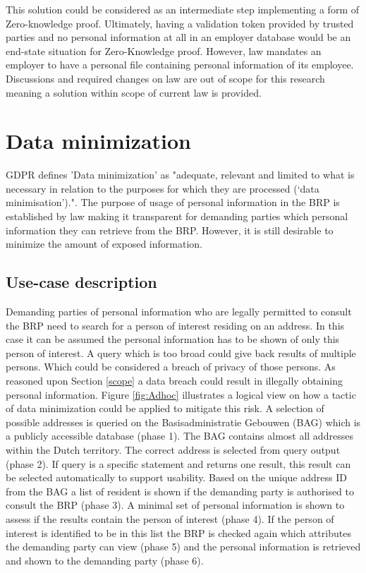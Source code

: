 This solution could be considered as an intermediate step implementing a form of Zero-knowledge proof. Ultimately, having a validation token provided by trusted parties and no personal information at all in an employer database would be an end-state situation for Zero-Knowledge proof. However, law mandates an employer to have a personal file containing personal information of its employee. Discussions and required changes on law are out of scope for this research meaning a solution within scope of current law is provided.
\clearpage

\section{Data minimization} \label{data-minimization}

GDPR \cite{GDPR} defines 'Data minimization' as "adequate, relevant and limited to what is necessary in relation to the purposes for which they are processed (‘data minimisation’).". The purpose of usage of personal information in the BRP is established by law making it transparent for demanding parties which personal information they can retrieve from the BRP. However, it is still desirable to minimize the amount of exposed information.

\subsection{Use-case description}
Demanding parties of personal information who are legally permitted to consult the BRP need to search for a person of interest residing on an address. In this case it can be assumed the personal information has to be shown of only this person of interest. A query which is too broad could give back results of multiple persons. Which could be considered a breach of privacy of those persons. As reasoned upon Section \ref{scope} a data breach could result in illegally obtaining personal information. Figure \ref{fig:Adhoc} illustrates a logical view on how a tactic of data minimization could be applied to mitigate this risk. A selection of possible addresses is queried on the Basisadministratie Gebouwen (BAG) \cite{BAG} which is a publicly accessible database (phase 1). The BAG contains almost all addresses within the Dutch territory. The correct address is selected from query output (phase 2). If query is a specific statement and returns one result, this result can be selected automatically to support usability. Based on the unique address ID from the BAG a list of resident is shown if the demanding party is authorised to consult the BRP (phase 3). A minimal set of personal information is shown to assess if the results contain the person of interest (phase 4). If the person of interest is identified to be in this list the BRP is checked again which attributes the demanding party can view (phase 5) and the personal information is retrieved and shown to the demanding party (phase 6).
    
